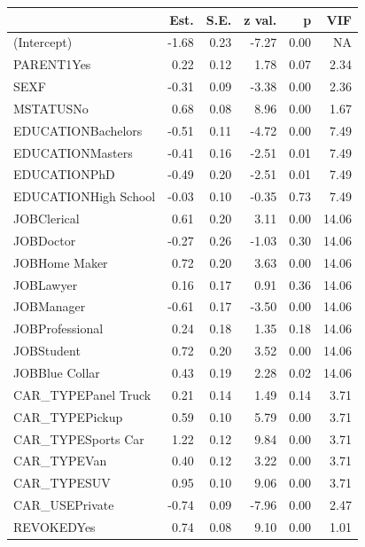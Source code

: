 \documentclass[]{article}
\begin{document}
\begin{table}[!h]
\centering
\begin{threeparttable}
\begin{tabular}{lrrrrr}
\toprule
  & Est. & S.E. & z val. & p & VIF\\
\midrule
\rowcolor{gray!6}  (Intercept) & -1.68 & 0.23 & -7.27 & 0.00 & NA\\
PARENT1Yes & 0.22 & 0.12 & 1.78 & 0.07 & 2.34\\
\rowcolor{gray!6}  SEXF & -0.31 & 0.09 & -3.38 & 0.00 & 2.36\\
MSTATUSNo & 0.68 & 0.08 & 8.96 & 0.00 & 1.67\\
\rowcolor{gray!6}  EDUCATIONBachelors & -0.51 & 0.11 & -4.72 & 0.00 & 7.49\\
\addlinespace
EDUCATIONMasters & -0.41 & 0.16 & -2.51 & 0.01 & 7.49\\
\rowcolor{gray!6}  EDUCATIONPhD & -0.49 & 0.20 & -2.51 & 0.01 & 7.49\\
EDUCATIONHigh School & -0.03 & 0.10 & -0.35 & 0.73 & 7.49\\
\rowcolor{gray!6}  JOBClerical & 0.61 & 0.20 & 3.11 & 0.00 & 14.06\\
JOBDoctor & -0.27 & 0.26 & -1.03 & 0.30 & 14.06\\
\addlinespace
\rowcolor{gray!6}  JOBHome Maker & 0.72 & 0.20 & 3.63 & 0.00 & 14.06\\
JOBLawyer & 0.16 & 0.17 & 0.91 & 0.36 & 14.06\\
\rowcolor{gray!6}  JOBManager & -0.61 & 0.17 & -3.50 & 0.00 & 14.06\\
JOBProfessional & 0.24 & 0.18 & 1.35 & 0.18 & 14.06\\
\rowcolor{gray!6}  JOBStudent & 0.72 & 0.20 & 3.52 & 0.00 & 14.06\\
\addlinespace
JOBBlue Collar & 0.43 & 0.19 & 2.28 & 0.02 & 14.06\\
\rowcolor{gray!6}  CAR\_TYPEPanel Truck & 0.21 & 0.14 & 1.49 & 0.14 & 3.71\\
CAR\_TYPEPickup & 0.59 & 0.10 & 5.79 & 0.00 & 3.71\\
\rowcolor{gray!6}  CAR\_TYPESports Car & 1.22 & 0.12 & 9.84 & 0.00 & 3.71\\
CAR\_TYPEVan & 0.40 & 0.12 & 3.22 & 0.00 & 3.71\\
\addlinespace
\rowcolor{gray!6}  CAR\_TYPESUV & 0.95 & 0.10 & 9.06 & 0.00 & 3.71\\
CAR\_USEPrivate & -0.74 & 0.09 & -7.96 & 0.00 & 2.47\\
\rowcolor{gray!6}  REVOKEDYes & 0.74 & 0.08 & 9.10 & 0.00 & 1.01\\

\end{tabular}
\end{threeparttable}
\end{table}
\end{document}
